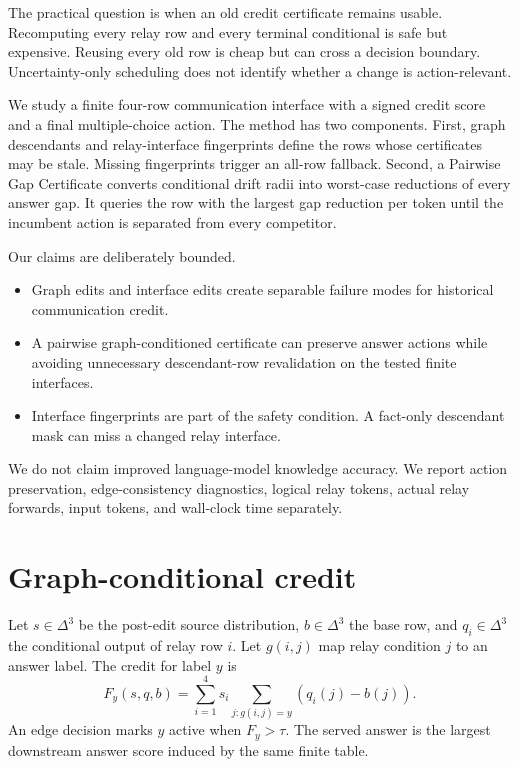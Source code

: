\documentclass[11pt]{article}
\begin{document}
The practical question is when an old credit certificate remains usable. Recomputing every relay row and every terminal conditional is safe but expensive. Reusing every old row is cheap but can cross a decision boundary. Uncertainty-only scheduling does not identify whether a change is action-relevant.

We study a finite four-row communication interface with a signed credit score and a final multiple-choice action. The method has two components. First, graph descendants and relay-interface fingerprints define the rows whose certificates may be stale. Missing fingerprints trigger an all-row fallback. Second, a Pairwise Gap Certificate converts conditional drift radii into worst-case reductions of every answer gap. It queries the row with the largest gap reduction per token until the incumbent action is separated from every competitor.

Our claims are deliberately bounded.
\begin{itemize}
\item Graph edits and interface edits create separable failure modes for historical communication credit.
\item A pairwise graph-conditioned certificate can preserve answer actions while avoiding unnecessary descendant-row revalidation on the tested finite interfaces.
\item Interface fingerprints are part of the safety condition. A fact-only descendant mask can miss a changed relay interface.
\end{itemize}
We do not claim improved language-model knowledge accuracy. We report action preservation, edge-consistency diagnostics, logical relay tokens, actual relay forwards, input tokens, and wall-clock time separately.

\section{Graph-conditional credit}
Let $s\in\Delta^3$ be the post-edit source distribution, $b\in\Delta^3$ the base row, and $q_i\in\Delta^3$ the conditional output of relay row $i$. Let $g(i,j)$ map relay condition $j$ to an answer label. The credit for label $y$ is
\begin{equation}
F_y(s,q,b)=\sum_{i=1}^4 s_i\sum_{j:g(i,j)=y}(q_i(j)-b(j)).
\label{eq:credit}
\end{equation}
An edge decision marks $y$ active when $F_y>\tau$. The served answer is the largest downstream answer score induced by the same finite table.
\end{document}
